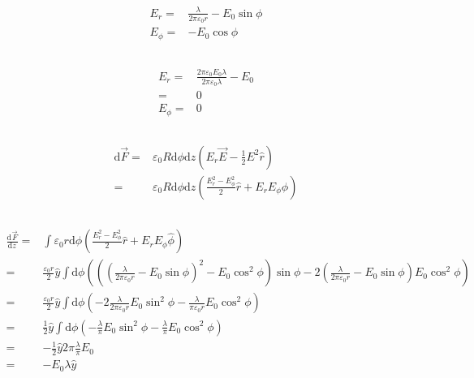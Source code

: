 \documentclass[10pt,fleqn]{article}
\newcommand{\ud}{\mathrm{d}}
\newcommand{\eqar}[1]
{
  \begin{align*}
    #1
  \end{align*}
}
\newcommand{\paren}[1]{{\left({#1}\right)}}
\newcommand{\diff}[3][{}]{{\frac{\ud^{#1} {#2}}{\ud {#3}{}^{#1}}}}
\begin{document}
\subsection{}
\eqar{
  E_r=&\frac{\lambda}{2\pi\varepsilon_0 r}-E_0\sin\phi\\
  E_\phi=&-E_0\cos\phi
}
\subsection{}
\eqar{
  E_r=&\frac{2\pi\varepsilon_0 E_0\lambda}{2\pi\varepsilon_0 \lambda}-E_0\\
  =&0\\
  E_\phi=&0
}
\subsection{}
\eqar{
  \ud\vec F=&\varepsilon_0R\ud\phi\ud z\paren{E_r\vec E-\frac{1}{2}E^2\hat r}\\
  =&\varepsilon_0R\ud\phi\ud z\paren{\frac{E_r^2-E_\phi^2}2\hat r+E_rE_\phi\hat\phi}
}
\subsection{}
\eqar{
  \diff{\vec F}{z}=&\int\varepsilon_0r\ud\phi\paren{\frac{E_r^2-E_\phi^2}2\hat r+E_rE_\phi\hat\phi}\\
  =&\frac{\varepsilon_0r}2\hat y\int\ud\phi\paren{\paren{\paren{\frac{\lambda}{2\pi\varepsilon_0 r}-E_0\sin\phi}^2-E_0\cos^2\phi}\sin\phi-2\paren{\frac{\lambda}{2\pi\varepsilon_0 r}-E_0\sin\phi}E_0\cos^2\phi}\\
  =&\frac{\varepsilon_0r}2\hat y\int\ud\phi\paren{-2\frac{\lambda}{2\pi\varepsilon_0 r}E_0\sin^2\phi-\frac{\lambda}{\pi\varepsilon_0 r}E_0\cos^2\phi}\\
  =&\frac{1}2\hat y\int\ud\phi\paren{-\frac{\lambda}{\pi}E_0\sin^2\phi-\frac{\lambda}{\pi}E_0\cos^2\phi}\\
  =&-\frac{1}2\hat y2\pi\frac{\lambda}{\pi}E_0\\
  =&-E_0\lambda\hat y
}

\section{}
\subsection{}
\subsection{}
\subsection{}
\subsection{}
\end{document}
